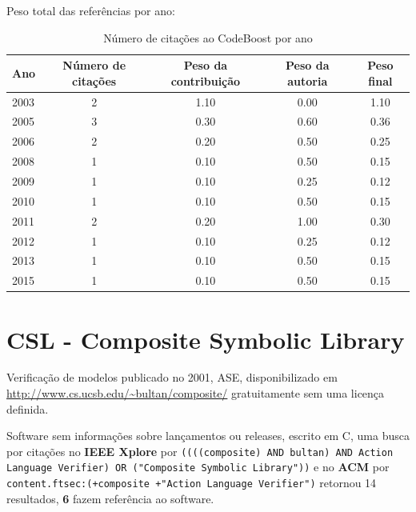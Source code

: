 Peso total das referências por ano:

\begin{table}[h]
\caption{Número de citações ao CodeBoost por ano}
\centering
\begin{tabular}{| l | c | c | c | c |}
  \hline
  Ano & Número de citações & Peso da contribuição & Peso da autoria & Peso final \\
  \hline
  2003
    & 2
    & 1.10
    & 0.00
    & 1.10 \\
  2005
    & 3
    & 0.30
    & 0.60
    & 0.36 \\
  2006
    & 2
    & 0.20
    & 0.50
    & 0.25 \\
  2008
    & 1
    & 0.10
    & 0.50
    & 0.15 \\
  2009
    & 1
    & 0.10
    & 0.25
    & 0.12 \\
  2010
    & 1
    & 0.10
    & 0.50
    & 0.15 \\
  2011
    & 2
    & 0.20
    & 1.00
    & 0.30 \\
  2012
    & 1
    & 0.10
    & 0.25
    & 0.12 \\
  2013
    & 1
    & 0.10
    & 0.50
    & 0.15 \\
  2015
    & 1
    & 0.10
    & 0.50
    & 0.15 \\
  \hline
\end{tabular}
\end{table}


\section{CSL - Composite Symbolic Library}

Verificação de modelos
publicado no 2001, ASE,
disponibilizado em \url{http://www.cs.ucsb.edu/~bultan/composite/}
gratuitamente
sem uma licença definida.

Software sem informações sobre lançamentos ou releases,
escrito em C,
uma busca por citações no {\bf IEEE Xplore} por
\texttt{((((composite) AND bultan) AND Action Language Verifier) OR ("Composite Symbolic Library"))}
e no {\bf ACM} por
\texttt{content.ftsec:(+composite +"Action Language Verifier")}
retornou
14 resultados,
{\bf 6} fazem referência ao software.


